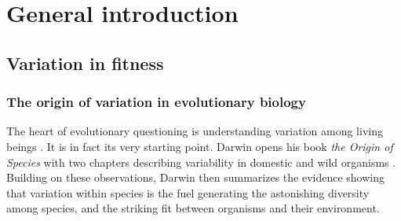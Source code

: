 
\chapter[\texorpdfstring{Chapter 1 \\ General introduction}{Chapter 1 General introduction}]{General introduction}
\label{chap:intro}

\section{Variation in fitness}
\subsection{The origin of variation in evolutionary biology}
The heart of evolutionary questioning is understanding variation among living beings \parencite{Lynch1998, Wayne2006, Kruuk2014}. It is in fact its very starting point. Darwin opens his book \emph{the Origin of Species} with two chapters describing variability in domestic and wild organisms \parencite{Darwin1859}.
Building on these observations, Darwin then summarizes the evidence showing that variation within species is the fuel generating the astonishing diversity among species, and the striking fit between organisms and their environment.

